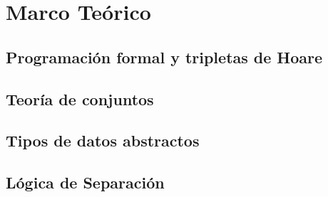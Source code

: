 \chapter{Marco Teórico}
\label{capitulo1}

\section{Programación formal y tripletas de Hoare}

\section{Teoría de conjuntos}

\section{Tipos de datos abstractos}

\section{Lógica de Separación}
